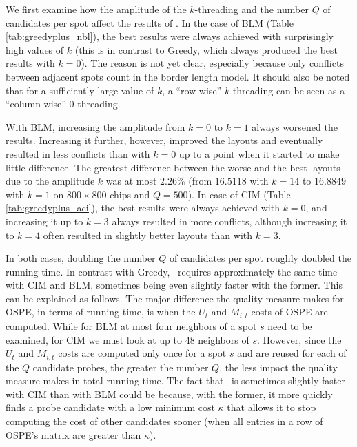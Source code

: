 We first examine how the amplitude of the $k$-threading and the number $Q$ of
candidates per spot affect the results of \Greedyplus. In the case of BLM (Table
\ref{tab:greedyplus_nbl}), the best results were always achieved with
surprisingly high values of $k$ (this is in contrast to Greedy, which always
produced the best results with $k=0$). The reason is not yet clear, especially
because only conflicts between adjacent spots count in the border length model.
It should also be noted that for a sufficiently large value of $k$, a
``row-wise'' $k$-threading can be seen as a ``column-wise'' 0-threading.

With BLM, increasing the amplitude from $k=0$ to $k=1$ always worsened the
results. Increasing it further, however, improved the layouts and eventually
resulted in less conflicts than with $k=0$ up to a point when it started to make
little difference. The greatest difference between the worse and the best
layouts due to the amplitude $k$ was at most $2.26\%$ (from $16.5118$ with
$k=14$ to $16.8849$ with $k=1$ on $800\times 800$ chips and $Q=500$). In case of
CIM (Table \ref{tab:greedyplus_aci}), the best results were always achieved with
$k=0$, and increasing it up to $k=3$ always resulted in more conflicts, although
increasing it to $k=4$ often resulted in slightly better layouts than with
$k=3$.

In both cases, doubling the number $Q$ of candidates per spot roughly doubled
the running time. In contrast with Greedy, \Greedyplus\ requires approximately
the same time with CIM and BLM, sometimes being even slightly faster with the
former. This can be explained as follows. The major difference the quality
measure makes for OSPE, in terms of running time, is when the $U_t$ and
$M_{i,t}$ costs of OSPE are computed. While for BLM at most four neighbors of a
spot $s$ need to be examined, for CIM we must look at up to 48 neighbors of $s$.
However, since the $U_t$ and $M_{i,t}$ costs are computed only once for a spot
$s$ and are reused for each of the $Q$ candidate probes, the greater the number
$Q$, the less impact the quality measure makes in total running time. The fact
that \Greedyplus\ is sometimes slightly faster with CIM than with BLM could be
because, with the former, it more quickly finds a probe candidate with a low
minimum cost $\kappa$ that allows it to stop computing the cost of other
candidates sooner (when all entries in a row of OSPE's matrix are greater than
$\kappa$).

